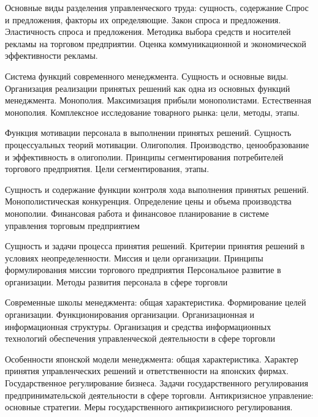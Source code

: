 \documentclass[
	11pt,
	a4paper,
	]
	{article}
\begin{document}
\bigskip

\noindent{} 
	{
		Основные виды разделения управленческого труда: сущность, содержание
	}{
		Спрос и предложения, факторы их определяющие. Закон спроса и предложения. Эластичность спроса и предложения.
	}{
		Методика выбора средств и носителей рекламы на торговом предприятии. Оценка коммуникационной и экономической эффективности рекламы.
	}

\bigskip

\noindent{} 
	{
		Система функций современного менеджмента. Сущность и основные виды. Организация реализации принятых решений как одна из основных функций менеджмента.
	}{
		Монополия. Максимизация прибыли монополистами. Естественная монополия.
	}{
		Комплексное исследование товарного рынка: цели, методы, этапы.
	}

\bigskip

\noindent{} 
	{
		Функция мотивации персонала в выполнении принятых решений. Сущность процессуальных теорий мотивации.
	}{
		Олигополия. Производство, ценообразование и эффективность в олигополии.
	}{
		Принципы сегментирования потребителей торгового предприятия. Цели сегментирования, этапы.
	}

\bigskip

\noindent{} 
	{
		Сущность и содержание функции контроля хода выполнения принятых решений.
	}{
		Монополистическая конкуренция. Определение цены и объема производства монополии.
	}{
		Финансовая работа и финансовое планирование в системе управления торговым предприятием
	}

\bigskip

\noindent{} 
	{
		Сущность и задачи процесса принятия решений. Критерии принятия решений в условиях неопределенности.
	}{
		Миссия и цели организации. Принципы формулирования миссии торгового предприятия
	}{
		Персональное развитие в организации. Методы развития персонала в сфере торговли
	}

\bigskip

\noindent{} 
	{
		Современные школы менеджмента: общая характеристика.
	}{
		Формирование целей организации. Функционирования организации. Организационная и информационная структуры.
	}{
		Организация и средства информационных технологий обеспечения управленческой деятельности в сфере торговли
	}

\bigskip

\noindent{} 
	{
		Особенности японской модели менеджмента: общая характеристика. Характер принятия управленческих решений и ответственности на японских фирмах.
	}{
		Государственное регулирование бизнеса. Задачи государственного регулирования предпринимательской деятельности в сфере торговли.
	}{
		Антикризисное управление: основные стратегии. Меры государственного антикризисного регулирования.
	}
\end{document}
